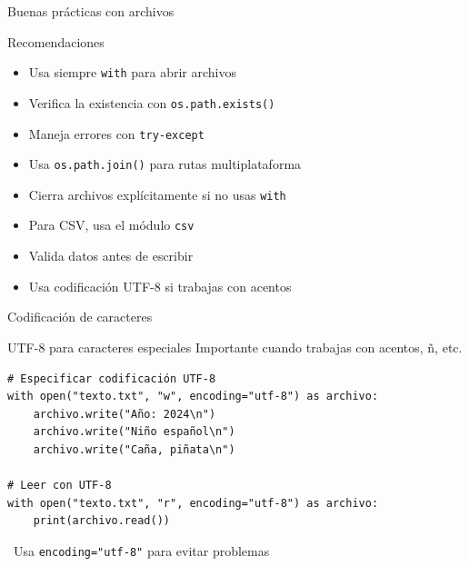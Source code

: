 \documentclass{beamer}
\begin{document}
\begin{frame}{Buenas prácticas con archivos \faCheckDouble}
\begin{conceptbox}{Recomendaciones}
\small
\begin{itemize}
    \item[\faCheck] Usa siempre \texttt{with} para abrir archivos
    \item[\faCheck] Verifica la existencia con \texttt{os.path.exists()}
    \item[\faCheck] Maneja errores con \texttt{try-except}
    \item[\faCheck] Usa \texttt{os.path.join()} para rutas multiplataforma
    \item[\faCheck] Cierra archivos explícitamente si no usas \texttt{with}
    \item[\faCheck] Para CSV, usa el módulo \texttt{csv}
    \item[\faCheck] Valida datos antes de escribir
    \item[\faCheck] Usa codificación UTF-8 si trabajas con acentos
\end{itemize}
\end{conceptbox}
\end{frame}

\begin{frame}[fragile]{Codificación de caracteres \faLanguage}
\begin{conceptbox}{UTF-8 para caracteres especiales}
Importante cuando trabajas con acentos, ñ, etc.
\end{conceptbox}

\begin{lstlisting}
# Especificar codificación UTF-8
with open("texto.txt", "w", encoding="utf-8") as archivo:
    archivo.write("Año: 2024\n")
    archivo.write("Niño español\n")
    archivo.write("Caña, piñata\n")

# Leer con UTF-8
with open("texto.txt", "r", encoding="utf-8") as archivo:
    print(archivo.read())
\end{lstlisting}

\vspace{-0.1cm}
\begin{notebox}
\small\faExclamationTriangle\ Usa \texttt{encoding="utf-8"} para evitar problemas
\end{notebox}
\end{frame}
\end{document}
